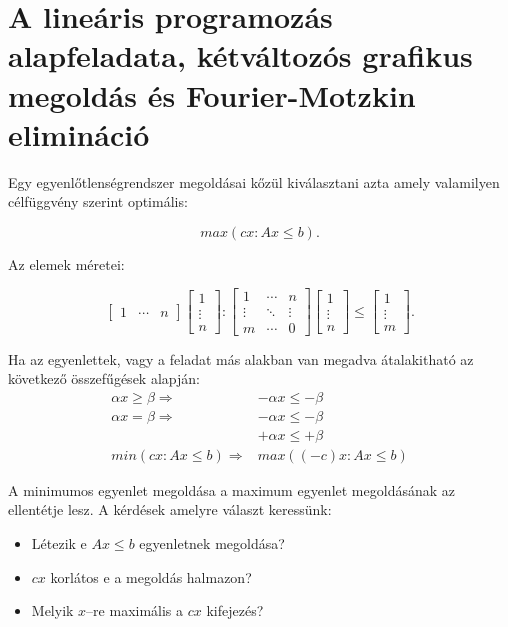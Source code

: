 \newpage
\section{A lineáris programozás alapfeladata, kétváltozós grafikus megoldás és Fourier-Motzkin elimináció}

Egy egyenlőtlenségrendszer megoldásai kőzül kiválasztani azta amely valamilyen
célfüggvény szerint optimális:

\begin{displaymath}
max(cx: Ax \leq b).
\end{displaymath}

Az elemek méretei: 

\begin{displaymath}
\begin{bmatrix} 1 &  \cdots &  n \end{bmatrix}
\begin{bmatrix} 1 \\ \vdots \\  n \end{bmatrix}
:
\begin{bmatrix} 1 & \cdots & n \\ \vdots & \ddots & \vdots \\ m  & \cdots & 0 \end{bmatrix}
\begin{bmatrix} 1 \\ \vdots \\  n \end{bmatrix}
\leq
\begin{bmatrix} 1 \\ \vdots \\  m \end{bmatrix}.
\end{displaymath}

Ha az egyenlettek, vagy a feladat más alakban van megadva átalakitható az
következő összefűgések alapján:
\begin{align*}
\alpha x \geq \beta  \Rightarrow  &-\alpha x \leq -\beta \\
\alpha x  =    \beta \Rightarrow  & -\alpha x \leq-\beta \\
									 & +\alpha x \leq+\beta \\
min(cx:Ax \leq b)	 \Rightarrow    & max((-c)x:Ax \leq b)
\end{align*}

A minimumos egyenlet megoldása a maximum egyenlet megoldásának az ellentétje lesz.
A kérdések amelyre választ keressünk:
\begin{itemize}
  \item Létezik e $Ax \leq b$ egyenletnek megoldása?
  \item $cx$ korlátos e a megoldás halmazon?
  \item Melyik $x$--re maximális a $cx$ kifejezés?
\end{itemize}

